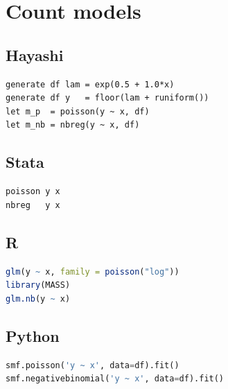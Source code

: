 \section{Count models}

\subsection*{Hayashi}

\begin{lstlisting}
generate df lam = exp(0.5 + 1.0*x)
generate df y   = floor(lam + runiform())
let m_p  = poisson(y ~ x, df)
let m_nb = nbreg(y ~ x, df)
\end{lstlisting}

\subsection*{Stata}

\begin{lstlisting}[language={}, basicstyle=\ttfamily\small,
  frame=single, numbers=none, backgroundcolor=\color{codbg}]
poisson y x
nbreg   y x
\end{lstlisting}

\subsection*{R}

\begin{lstlisting}[language=R, basicstyle=\ttfamily\small,
  frame=single, numbers=none, backgroundcolor=\color{codbg},
  keywordstyle=\color{keyword}\bfseries,
  stringstyle=\color{string},
  commentstyle=\color{comment}\itshape]
glm(y ~ x, family = poisson("log"))
library(MASS)
glm.nb(y ~ x)
\end{lstlisting}

\subsection*{Python}

\begin{lstlisting}[language=Python, basicstyle=\ttfamily\small,
  frame=single, numbers=none, backgroundcolor=\color{codbg},
  keywordstyle=\color{keyword}\bfseries,
  stringstyle=\color{string},
  commentstyle=\color{comment}\itshape]
smf.poisson('y ~ x', data=df).fit()
smf.negativebinomial('y ~ x', data=df).fit()
\end{lstlisting}


